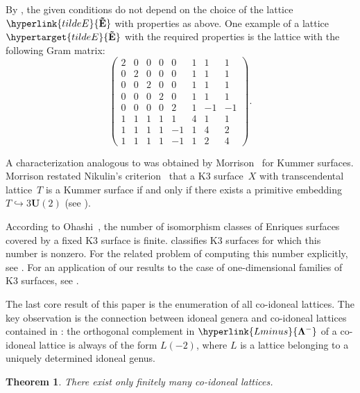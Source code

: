 \documentclass[a4paper]{amsart}
\theoremstyle{definition}
\theoremstyle{plain}
\newtheorem{theorem}[definition]{Theorem}
\newcommand{\bU}{\mathbf{U}}
\newcommand{\bLambda}{\mathbf{\Lambda}}
\newcommand{\Lminus}{\hyperlink{Lminus}{\bLambda^-}}
\newcommand{\Etilde}{\hyperlink{tildeE}{\mathbf{\tilde{E}}}}
\begin{document}
By \cite[Theorem~1.14.2]{Nikulin:int.sym.bilinear.forms}, the given conditions do not depend on the choice of the lattice \(\Etilde\) with properties as above.
One example of a lattice \(\hypertarget{tildeE}{\mathbf{\tilde E}}\) with the required properties is the lattice with the following Gram matrix:
{\small \[
\begin{pmatrix}
    2 & 0 & 0 & 0 & 0 & 1 &  1 &  1 \\
    0 & 2 & 0 & 0 & 0 & 1 &  1 &  1 \\
    0 & 0 & 2 & 0 & 0 & 1 &  1 &  1 \\
    0 & 0 & 0 & 2 & 0 & 1 &  1 &  1 \\
    0 & 0 & 0 & 0 & 2 & 1 & -1 & -1 \\
    1 & 1 & 1 & 1 & 1 & 4 &  1 &  1 \\
    1 & 1 & 1 & 1 & -1 & 1 & 4 &  2 \\
    1 & 1 & 1 & 1 & -1 & 1 & 2 & 4
\end{pmatrix}.
\]}

A characterization analogous to  was obtained by Morrison~\cite{morrison:K3.large.picard} for Kummer surfaces. 
Morrison restated Nikulin's criterion~\cite{nikulin:kummer} that a K3 surface~\(X\) with transcendental lattice~\(T\) is a Kummer surface if and only if there exists a primitive embedding \(T \hookrightarrow 3 \bU(2)\) (see \cite[Corollary 4.4]{morrison:K3.large.picard}).

According to Ohashi~\cite{Ohashi07}, the number of isomorphism classes of Enriques surfaces covered by a fixed K3 surface is finite.  classifies K3 surfaces for which this number is nonzero. For the related problem of computing this number explicitly, see \cite{Ohashi, Ohashi07, ShimadaVeniani}.
For an application of our results to the case of one-dimensional families of K3 surfaces, see \cite{Festi.Veniani}.

The last core result of this paper is the enumeration of all co-idoneal lattices. 
The key observation is the connection between idoneal genera and co-idoneal lattices contained in :
the orthogonal complement in \(\Lminus\) of a co-idoneal lattice is always of the form \(L(-2)\), 
where \(L\) is a lattice belonging to a uniquely determined idoneal genus. 

\begin{theorem} \label{thm:co-idoneal}
    There exist only finitely many co-idoneal lattices.
\end{theorem}
\end{document}
